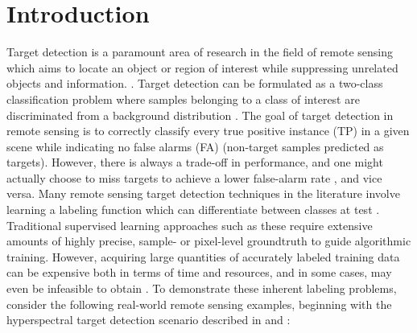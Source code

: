 \chapter{Introduction}
\vspace{1cm}

Target detection is a paramount area of research in the field of remote sensing which aims to locate an object or region of interest while suppressing unrelated objects and information. \citep{Geng2017TargetDetection,Chaudhuri1995TargetDetection}.  Target detection can be formulated as a two-class classification problem where samples belonging to a class of interest are discriminated from a background distribution \citep{Zare2016MIACE}.  The goal of target detection in remote sensing is to correctly classify every true positive instance (TP) in a given scene while indicating no false alarms (FA) (non-target samples predicted as targets).  However, there is always a trade-off in performance, and one might actually choose to miss targets to achieve a lower false-alarm rate \citep{WeinbergerFalseAlarms}, and vice versa. Many remote sensing target detection techniques in the literature involve learning a labeling function which can differentiate between classes at test \citep{Geng2017TargetDetection,Chaudhuri1995TargetDetection}.  Traditional supervised learning approaches such as these require extensive amounts of highly precise, sample- or pixel-level groundtruth to guide algorithmic training.  However, acquiring large quantities  of accurately labeled training data can be expensive both in terms of time and resources, and in some cases, may even be infeasible to obtain \citep{Xu2014LargeMarginWeaklySupervisedDR}.  To demonstrate these inherent labeling problems, consider the following real-world remote sensing examples, beginning with the hyperspectral target detection scenario described in \citep{Du2017Thesis} and \citep{Bocinsky2019Thesis}:

